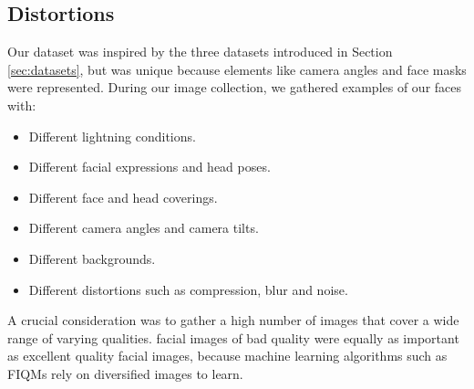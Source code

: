 \subsection{Distortions}
Our dataset was inspired by the three datasets introduced in Section \ref{sec:datasets}, but was unique because elements like camera angles and face masks were represented. During our image collection, we gathered examples of our faces with: 
%
\begin{itemize}
    \item Different lightning conditions.
    \item Different facial expressions and head poses.
    \item Different face and head coverings. 
    \item Different camera angles and camera tilts.
    \item Different backgrounds.
    \item Different distortions such as compression, blur and noise.
\end{itemize}

A crucial consideration was to gather a high number of images that cover a wide range of varying qualities. facial images of bad quality were equally as important as excellent quality facial images, because machine learning algorithms such as FIQMs rely on diversified images to learn.  

